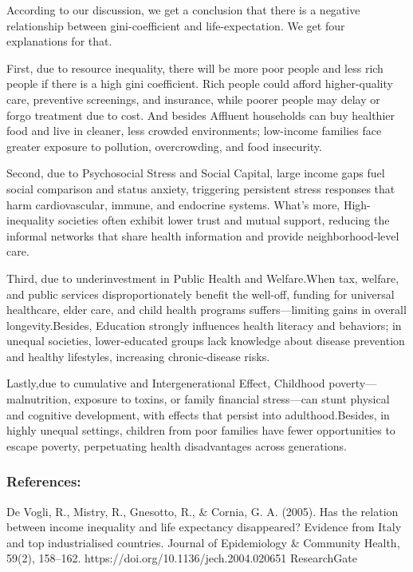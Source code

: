\documentclass[
  11pt,
]{article}
\begin{document}
According to our discussion, we get a conclusion that there is a
negative relationship between gini-coefficient and life-expectation. We
get four explanations for that.

First, due to resource inequality, there will be more poor people and
less rich people if there is a high gini coefficient. Rich people could
afford higher-quality care, preventive screenings, and insurance, while
poorer people may delay or forgo treatment due to cost. And besides
Affluent households can buy healthier food and live in cleaner, less
crowded environments; low-income families face greater exposure to
pollution, overcrowding, and food insecurity.

Second, due to Psychosocial Stress and Social Capital, large income gaps
fuel social comparison and status anxiety, triggering persistent stress
responses that harm cardiovascular, immune, and endocrine systems.
What's more, High-inequality societies often exhibit lower trust and
mutual support, reducing the informal networks that share health
information and provide neighborhood‐level care.

Third, due to underinvestment in Public Health and Welfare.When tax,
welfare, and public services disproportionately benefit the well-off,
funding for universal healthcare, elder care, and child health programs
suffers---limiting gains in overall longevity.Besides, Education
strongly influences health literacy and behaviors; in unequal societies,
lower-educated groups lack knowledge about disease prevention and
healthy lifestyles, increasing chronic‐disease risks.

Lastly,due to cumulative and Intergenerational Effect, Childhood
poverty---malnutrition, exposure to toxins, or family financial
stress---can stunt physical and cognitive development, with effects that
persist into adulthood.Besides, in highly unequal settings, children
from poor families have fewer opportunities to escape poverty,
perpetuating health disadvantages across generations.

\subsubsection{References:}\label{references}

De Vogli, R., Mistry, R., Gnesotto, R., \& Cornia, G. A. (2005). Has the
relation between income inequality and life expectancy disappeared?
Evidence from Italy and top industrialised countries. Journal of
Epidemiology \& Community Health, 59(2), 158--162.
https://doi.org/10.1136/jech.2004.020651 ResearchGate
\end{document}
